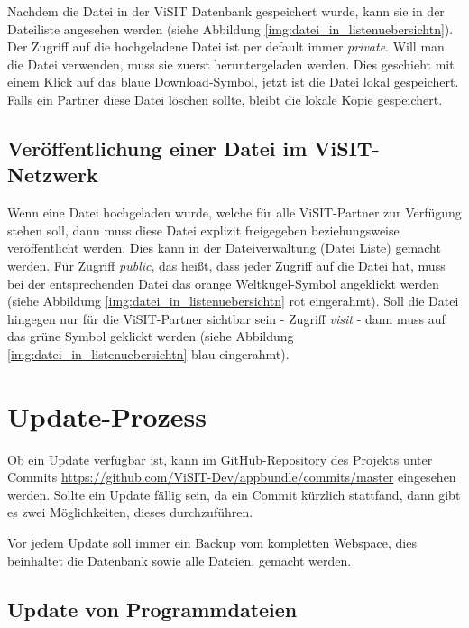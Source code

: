 Nachdem die Datei in der ViSIT Datenbank gespeichert wurde, kann sie in der Dateiliste angesehen werden (siehe Abbildung \ref{img:datei_in_listenuebersichtn}). Der Zugriff auf die hochgeladene Datei ist per default immer \textit{private}. Will man die Datei verwenden, muss sie zuerst heruntergeladen werden. Dies geschieht mit einem Klick auf das blaue Download-Symbol, jetzt ist die Datei lokal gespeichert. 
Falls ein Partner diese Datei löschen sollte, bleibt die lokale Kopie gespeichert.


\subsection{Veröffentlichung einer Datei im ViSIT-Netzwerk}

Wenn eine Datei hochgeladen wurde, welche für alle ViSIT-Partner zur Verfügung stehen soll, dann muss diese Datei explizit freigegeben beziehungsweise veröffentlicht werden. Dies kann in der Dateiverwaltung (Datei Liste) gemacht werden. 
Für Zugriff \textit{public}, das heißt, dass jeder Zugriff auf die Datei hat, muss bei der entsprechenden Datei das orange Weltkugel-Symbol angeklickt werden (siehe Abbildung \ref{img:datei_in_listenuebersichtn} rot eingerahmt).
Soll die Datei hingegen nur für die ViSIT-Partner sichtbar sein - Zugriff \textit{visit} - dann muss auf das grüne Symbol geklickt werden (siehe Abbildung \ref{img:datei_in_listenuebersichtn} blau eingerahmt).










\cleardoublepage

\section{Update-Prozess}

Ob ein Update verfügbar ist, kann im GitHub-Repository des Projekts unter Commits \url{https://github.com/ViSIT-Dev/appbundle/commits/master} eingesehen werden. Sollte ein Update fällig sein, da ein Commit kürzlich stattfand, dann gibt es zwei Möglichkeiten, dieses durchzuführen.

Vor jedem Update soll immer ein Backup vom kompletten Webspace, dies beinhaltet die Datenbank sowie alle Dateien, gemacht werden.


\subsection{Update von Programmdateien}

